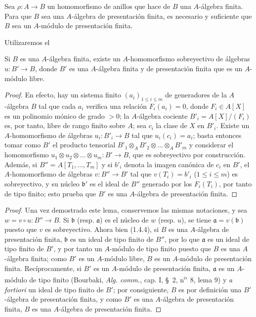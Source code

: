 \begin{proposition}[1.4.7]
\label{IV.1.4.7-fr}
Sea $\rho:A\to B$ un homomorfismo de anillos que hace de $B$ una $A$-álgebra
finita. Para que $B$ sea una $A$-álgebra de presentación finita, es necesario y
suficiente que $B$ sea un $A$-módulo de presentación finita.
\end{proposition}

Utilizaremos el

\begin{lemma}[1.4.7.1]
\label{IV.1.4.7.1-fr}
Si $B$ es una $A$-álgebra finita, existe un $A$-homomorfismo sobreyectivo
de álgebras $u:B'\to B$, donde $B'$ es una $A$-álgebra finita y de presentación
finita que es un $A$-módulo libre.
\end{lemma}

\begin{proof}
En efecto, hay un sistema finito $(a_i)_{1\leq i\leq m}$ de generadores de la
$A$-álgebra $B$ tal que cada $a_i$ verifica una relación $F_i(a_i)=0$, donde
$F_i\in A[X]$ es un polinomio mónico de grado $>0$; la $A$-álgebra cociente
$B'_i=A[X]/(F_i)$ es, por tanto, libre de rango finito sobre $A$; sea $c_i$ la clase de
$X$ en $B'_i$. Existe un $A$-homomorfismo de álgebras $u_i:B'_i\to B$
tal que $u_i(c_i)=a_i$; basta entonces tomar como $B'$ el producto
tensorial $B'_1\otimes_AB'_2\otimes\ldots\otimes_AB'_m$ y considerar
el homomorfismo $u_1\otimes u_2\otimes\ldots\otimes u_m:B'\to B$, que es
sobreyectivo por construcción. Además, si $B''=A[T_1,\ldots,T_m]$ y si $b'_i$
denota la imagen canónica de $c_i$ en $B'$, el $A$-homomorfismo de álgebras
$v:B''\to B'$ tal que $v(T_i)=b'_i$ ($1\leq i\leq m$) es sobreyectivo, y su
núcleo $\mathfrak b'$ es el ideal de $B''$ generado por los $F_i(T_i)$, por tanto de
tipo finito; esto prueba que $B'$ es una $A$-álgebra de presentación finita.
\end{proof}

\begin{proof}
Una vez demostrado este lema, conservemos las mismas notaciones, y sea
$w=v\circ u:B''\to B$. Si $\mathfrak b$ (resp. $\mathfrak a$) es el núcleo de
$w$ (resp. $u$), se tiene $\mathfrak a=v(\mathfrak b)$ puesto que $v$ es sobreyectivo.
Ahora bien (1.4.4), si $B$ es una $A$-álgebra de presentación finita, $\mathfrak b$
es un ideal de tipo finito de $B''$, por lo que $\mathfrak a$ es un ideal de tipo
finito de $B'$, y por tanto un $A$-módulo de tipo finito puesto que $B$ es una $A$-álgebra
finita; como $B'$ es un $A$-módulo libre, $B$ es un $A$-módulo de
presentación finita. Recíprocamente, si $B'$ es un $A$-módulo de presentación
finita, $\mathfrak a$ es un $A$-módulo de tipo finito (Bourbaki,
\emph{Alg. comm.}, cap. I, \S~2, n\textsuperscript{o}~8, lema 9) y
\emph{a fortiori} un ideal de tipo finito de $B'$; por consiguiente, $B$ es por
definición una $B'$-álgebra de presentación finita, y como $B'$ es una
$A$-álgebra de presentación finita, $B$ es una $A$-álgebra de presentación
finita.
\end{proof}

